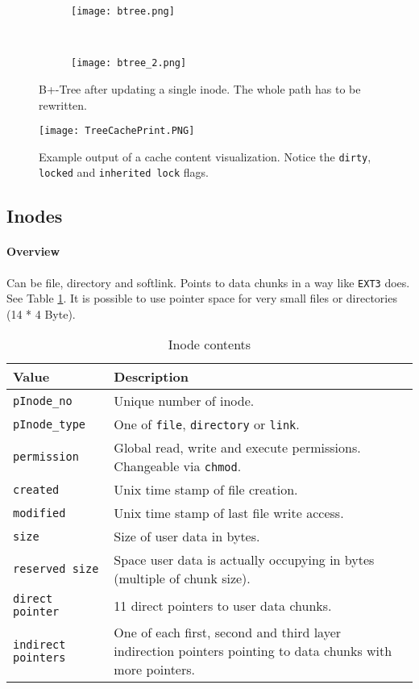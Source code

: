 \begin{figure}[htp]
	\centering
	\begin{subfigure}[t]{.9\textwidth}
		\centering\texttt{[image: btree.png]}
	\end{subfigure}\\
	\begin{subfigure}[t]{.9\textwidth}
		\centering\texttt{[image: btree\_2.png]}
	\end{subfigure}
	\caption{\label{fig:btreewandering}B+-Tree after updating a single inode. The whole path has to be rewritten.}
\end{figure}

\begin{figure}[htp]
	\centering\texttt{[image: TreeCachePrint.PNG]}
	\caption{\label{fig:TreeCachePrint}Example output of a cache content visualization. Notice the \texttt{dirty}, \texttt{locked} and \texttt{inherited lock} flags.}
\end{figure}

\subsection{Inodes}
\label{inode}
\paragraph{Overview}
Can be file, directory and softlink. Points to data chunks in a way like \texttt{EXT3} does. See Table \ref{tab:pinode}. It is possible to use pointer space for very small files or directories (14 * 4 Byte).
\begin{table}[htbp]
\caption{Inode contents}
\label{tab:pinode}
\begin{tabularx}{\textwidth}{lp{11cm}p{2.5cm}}
\toprule
Value & Description\\
\midrule
\texttt{pInode\_no} & Unique number of inode. \\
\texttt{pInode\_type} & One of \texttt{file}, \texttt{directory} or \texttt{link}.\\
\texttt{permission} & Global read, write and execute permissions. Changeable via \texttt{chmod}.\\
\texttt{created} & Unix time stamp of file creation.\\
\texttt{modified} & Unix time stamp of last file write access.\\
\texttt{size} & Size of user data in bytes. \\
\texttt{reserved size} & Space user data is actually occupying in bytes (multiple of chunk size).\\
\texttt{direct pointer} & 11 direct pointers to user data chunks.\\
\texttt{indirect pointers} & One of each first, second and third layer indirection pointers pointing to data chunks with more pointers.\\
\bottomrule
\end{tabularx}
\end{table} 

